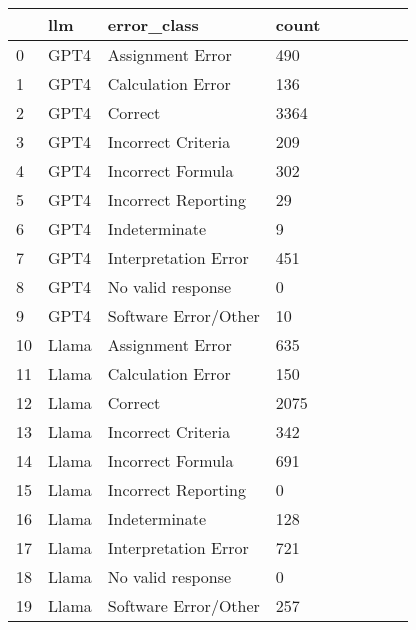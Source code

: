 \begin{tabular}{|l|l|l|l|l|l|l|l|l|}
\toprule
 & llm & error\_class & count \\
\midrule
0 & GPT4 & Assignment Error & 490 \\
1 & GPT4 & Calculation Error & 136 \\
2 & GPT4 & Correct & 3364 \\
3 & GPT4 & Incorrect Criteria & 209 \\
4 & GPT4 & Incorrect Formula & 302 \\
5 & GPT4 & Incorrect Reporting & 29 \\
6 & GPT4 & Indeterminate & 9 \\
7 & GPT4 & Interpretation Error & 451 \\
8 & GPT4 & No valid response & 0 \\
9 & GPT4 & Software Error/Other & 10 \\
10 & Llama & Assignment Error & 635 \\
11 & Llama & Calculation Error & 150 \\
12 & Llama & Correct & 2075 \\
13 & Llama & Incorrect Criteria & 342 \\
14 & Llama & Incorrect Formula & 691 \\
15 & Llama & Incorrect Reporting & 0 \\
16 & Llama & Indeterminate & 128 \\
17 & Llama & Interpretation Error & 721 \\
18 & Llama & No valid response & 0 \\
19 & Llama & Software Error/Other & 257 \\
\bottomrule
\end{tabular}

